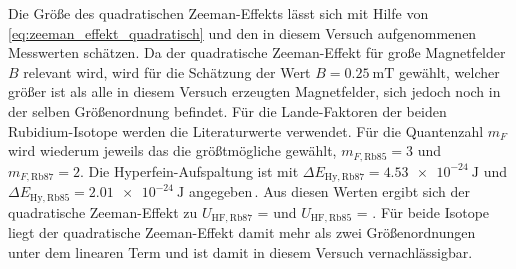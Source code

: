Die Größe des quadratischen Zeeman-Effekts lässt sich mit Hilfe von \cref{eq:zeeman_effekt_quadratisch}
und den in diesem Versuch aufgenommenen Messwerten schätzen. Da der quadratische Zeeman-Effekt für große
Magnetfelder $B$ relevant wird, wird für die Schätzung der Wert $B = \SI{0.25}{\milli\tesla}$ gewählt,
welcher größer ist als alle in diesem Versuch erzeugten Magnetfelder, sich jedoch noch in der selben 
Größenordnung befindet. Für die Lande-Faktoren der beiden Rubidium-Isotope  werden die Literaturwerte 
verwendet. Für die Quantenzahl $m_{F}$ wird wiederum jeweils das die größtmögliche gewählt,
$m_{F,\mathrm{Rb85}} = 3$ und $m_{F,\mathrm{Rb87}} = 2$. Die Hyperfein-Aufspaltung ist 
mit $\Delta E_{\mathrm{Hy},\mathrm{Rb87}} = \SI{4.53e-24}{\joule}$ und $\Delta E_{\mathrm{Hy},
\mathrm{Rb85}} = \SI{2.01e-24}{\joule}$ angegeben\,\cite{V21}. Aus diesen Werten ergibt sich der quadratische
Zeeman-Effekt zu $U_{\mathrm{HF},\mathrm{Rb87}}$ = 
und $U_{\mathrm{HF},\mathrm{Rb85}}$ = .
Für beide Isotope liegt der quadratische Zeeman-Effekt damit mehr als zwei Größenordnungen unter dem 
linearen Term und ist damit in diesem Versuch vernachlässigbar. 
 